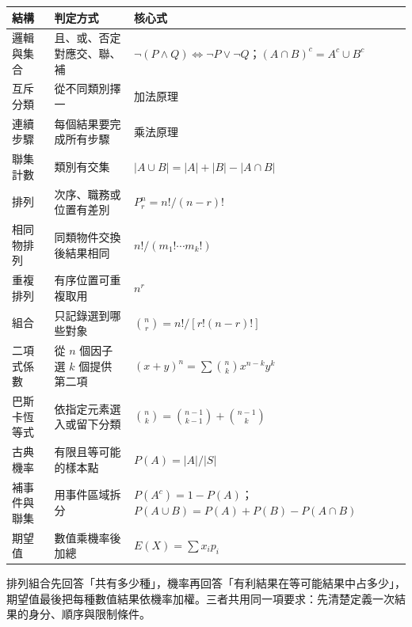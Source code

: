 \documentclass[11pt,a4paper]{article}
\newcounter{none}
\begin{document}
{\def\LTcaptype{none} %
\begin{longtable}[]{@{}
  >{\raggedright\arraybackslash}p{}
  >{\raggedright\arraybackslash}p{}
  >{\raggedright\arraybackslash}p{}@{}}
\toprule\noalign{}
\begin{minipage}[b]{\linewidth}\raggedright
結構
\end{minipage} & \begin{minipage}[b]{\linewidth}\raggedright
判定方式
\end{minipage} & \begin{minipage}[b]{\linewidth}\raggedright
核心式
\end{minipage} \\
\midrule\noalign{}
\endhead
\bottomrule\noalign{}
\endlastfoot
邏輯與集合 & 且、或、否定對應交、聯、補 & \(\neg(P\wedge Q)\Leftrightarrow\neg P\vee\neg Q\)；\((A\cap B)^c=A^c\cup B^c\) \\
互斥分類 & 從不同類別擇一 & 加法原理 \\
連續步驟 & 每個結果要完成所有步驟 & 乘法原理 \\
聯集計數 & 類別有交集 & \(|A\cup B|=|A|+|B|-|A\cap B|\) \\
排列 & 次序、職務或位置有差別 & \(P^n_r=n!/(n-r)!\) \\
相同物排列 & 同類物件交換後結果相同 & \(n!/(m_1!\cdots m_k!)\) \\
重複排列 & 有序位置可重複取用 & \(n^r\) \\
組合 & 只記錄選到哪些對象 & \(\binom nr=n!/[r!(n-r)!]\) \\
二項式係數 & 從 \(n\) 個因子選 \(k\) 個提供第二項 & \((x+y)^n=\sum\binom nkx^{n-k}y^k\) \\
巴斯卡恆等式 & 依指定元素選入或留下分類 & \(\binom nk=\binom{n-1}{k-1}+\binom{n-1}{k}\) \\
古典機率 & 有限且等可能的樣本點 & \(P(A)=|A|/|S|\) \\
補事件與聯集 & 用事件區域拆分 & \(P(A^c)=1-P(A)\)；\(P(A\cup B)=P(A)+P(B)-P(A\cap B)\) \\
期望值 & 數值乘機率後加總 & \(E(X)=\sum x_ip_i\) \\
\end{longtable}
}

排列組合先回答「共有多少種」，機率再回答「有利結果在等可能結果中占多少」，期望值最後把每種數值結果依機率加權。三者共用同一項要求：先清楚定義一次結果的身分、順序與限制條件。
\end{document}
